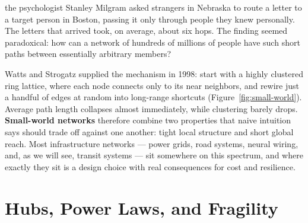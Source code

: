 \documentclass{tufte-book}
\newcommand{\keyterm}[1]{\textbf{#1}\marginnote{\textcolor{inkblue}{\textit{#1}} --- see running glossary.}}
\begin{document}
 the psychologist Stanley Milgram asked strangers in Nebraska to
route a letter to a target person in Boston, passing it only through people they
knew personally. The letters that arrived took, on average, about six hops.  The finding seemed paradoxical: how can a network of hundreds of
millions of people have such short paths between essentially arbitrary members?

\begin{marginfigure}
\centering
{}
\caption{A ring lattice (gray) becomes a small world once a few long-range
shortcuts (rust) are added --- the Watts--Strogatz construction.}
\label{fig:small-world}
\end{marginfigure}

Watts and Strogatz supplied the mechanism in 1998: start with a highly clustered
ring lattice, where each node connects only to its near neighbors, and rewire just
a handful of edges at random into long-range shortcuts (Figure~\ref{fig:small-world}).
Average path length collapses almost immediately, while clustering barely drops.
\keyterm{Small-world networks} therefore combine two properties that naive intuition
says should trade off against one another: tight local structure and short global
reach. Most infrastructure networks --- power grids, road systems, neural wiring,
and, as we will see, transit systems --- sit somewhere on this spectrum, and where
exactly they sit is a design choice with real consequences for cost and resilience.

\section{Hubs, Power Laws, and Fragility}
\label{sec:hubs}
\end{document}
